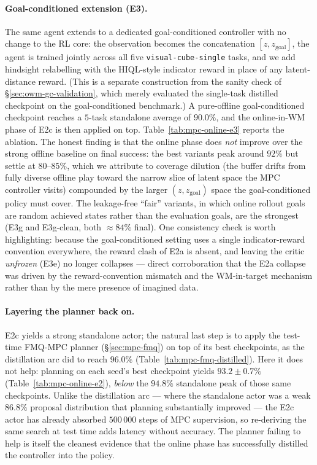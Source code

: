 \paragraph{Goal-conditioned extension (E3).}
The same agent extends to a dedicated goal-conditioned controller with
no change to the RL core: the observation becomes the concatenation
$[z, z_{\text{goal}}]$, the agent is trained jointly across all five
\texttt{visual-cube-single} tasks, and we add hindsight relabelling
\cite{her} with the HIQL-style indicator reward
\cite{park2024hiqlofflinegoalconditionedrl} in place of any
latent-distance reward. (This is a separate construction from the
sanity check of \S\ref{sec:owm-gc-validation}, which merely evaluated
the single-task distilled checkpoint on the goal-conditioned benchmark.)
A pure-offline goal-conditioned checkpoint reaches a $5$-task standalone
average of $90.0\%$, and the online-in-WM phase of E2c is then applied
on top. Table~\ref{tab:mpc-online-e3} reports the ablation. The honest
finding is that the online phase does \emph{not} improve over the strong
offline baseline on final success: the best variants peak around $92\%$
but settle at $80$--$85\%$, which we attribute to coverage dilution (the
buffer drifts from fully diverse offline play toward the narrow slice of
latent space the MPC controller visits) compounded by the larger
$(z, z_{\text{goal}})$ space the goal-conditioned policy must cover. The
leakage-free ``fair'' variants, in which online rollout goals are random
achieved states rather than the evaluation goals, are the strongest
(E3g and E3g-clean, both $\approx 84\%$ final). One consistency check is
worth highlighting: because the goal-conditioned setting uses a single
indicator-reward convention everywhere, the reward clash of E2a is
absent, and leaving the critic \emph{unfrozen} (E3e) no longer collapses
--- direct corroboration that the E2a collapse was driven by the
reward-convention mismatch and the WM-in-target mechanism rather than by
the mere presence of imagined data.

\paragraph{Layering the planner back on.}
E2c yields a strong standalone actor; the natural last step is to apply
the test-time FMQ-MPC planner (\S\ref{sec:mpc-fmq}) on top of its best
checkpoints, as the distillation arc did to reach $96.0\%$
(Table~\ref{tab:mpc-fmq-distilled}). Here it does not help: planning on
each seed's best checkpoint yields $93.2 \pm 0.7\%$
(Table~\ref{tab:mpc-online-e2}), \emph{below} the $94.8\%$ standalone
peak of those same checkpoints. Unlike the distillation arc --- where
the standalone actor was a weak $86.8\%$ proposal distribution that
planning substantially improved --- the E2c actor has already absorbed
$500\,000$ steps of MPC supervision, so re-deriving the same search at
test time adds latency without accuracy. The planner failing to help is
itself the cleanest evidence that the online phase has successfully
distilled the controller into the policy.

